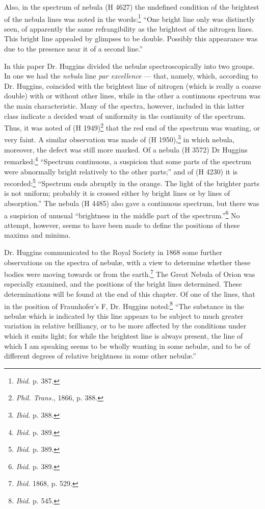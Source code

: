 \documentclass[a4paper, 12pt, oneside, polutonikogreek, english]{article}
\begin{document}
Also, in the spectrum of nebula (H 4627) the undefined condition of the brightest of the nebula lines was noted in the words:\footnote{\emph{Ibid.} p. 387.} ``One bright line only was distinctly seen, of apparently the same refrangibility as the brightest of the nitrogen lines. This bright line appealed by glimpses to be double. Possibly this appearance was due to the presence near it of a second line.''

In this paper Dr. Huggins divided the nebulæ spectroscopically into two groups. In one we had the \emph{nebula} line \emph{par excellence} --- that, namely, which, according to Dr. Huggins, coincided with the brightest line of nitrogen (which is really a coarse double) with or without other lines, while in the other a continuous spectrum was the main characteristic. Many of the spectra, however, included in this latter class indicate a decided want of uniformity in the continuity of the spectrum. Thus, it was noted of (H 1949)\footnote{\emph{Phil. Trans.}, 1866, p. 388.} that the red end of the spectrum was wanting, or very faint. A similar observation was made of (H 1950),\footnote{\emph{Ibid.} p. 388.} in which nebula, moreover, the defect was still more marked. Of a nebula (H 3572) Dr Huggins remarked:\footnote{\emph{Ibid.} p. 389.} ``Spectrum continuous, a suspicion that some parts of the spectrum were abnormally bright relatively to the other parts;'' and of (H 4230) it is recorded:\footnote{\emph{Ibid.} p. 389.} ``Spectrum ends abruptly in the orange. The light of the brighter parts is not uniform; probably it is crossed either by bright lines or by lines of absorption.'' The nebula (H 4485) also gave a continuous spectrum, but there was a suspicion of unusual ``brightness in the middle part of the spectrum.''\footnote{\emph{Ibid.} p. 389.} No attempt, however, seems to have been made to define the positions of these maxima and minima.

Dr. Huggins communicated to the Royal Society in 1868 some further observations on the spectra of nebulæ, with a view to determine whether these bodies were moving towards or from the earth.\footnote{\emph{Ibid.} 1868, p. 529.} The Great Nebula of Orion was especially examined, and the positions of the bright lines determined. These determinations will be found at the end of this chapter. Of one of the lines, that in the position of Fraunhofer's F, Dr. Huggins noted:\footnote{\emph{Ibid.} p. 545.} ``The substance in the nebulæ which is indicated by this line appears to be subject to much greater variation in relative brilliancy, or to be more affected by the conditions under which it emits light; for while the brightest line is always present, the line of which I am speaking seems to be wholly wanting in some nebulæ, and to be of different degrees of relative brightness in some other nebulæ.''
\end{document}
